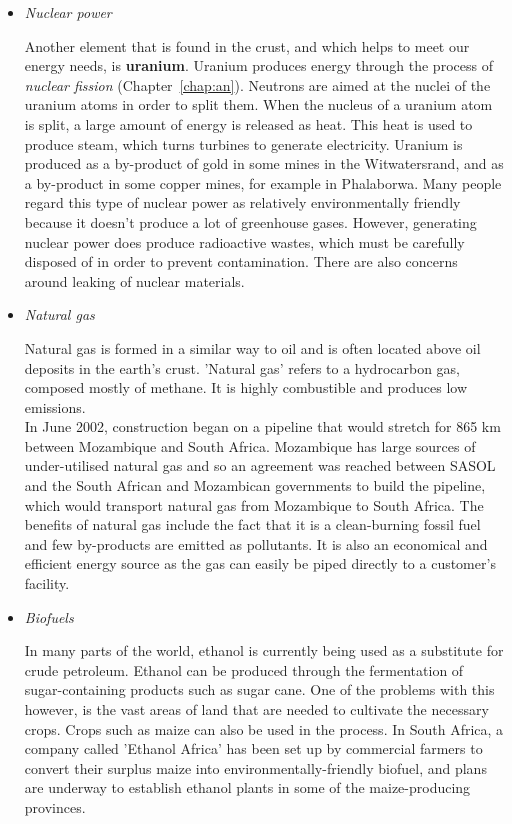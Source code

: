 \begin{itemize}

\item{\textit{Nuclear power}}

Another element that is found in the crust, and which helps to meet our energy needs, is \textbf{uranium}. Uranium produces energy through the process of \textit{nuclear fission} (Chapter~\ref{chap:an}). Neutrons are aimed at the nuclei of the uranium atoms in order to split them. When the nucleus of a uranium atom is split, a large amount of energy is released as heat. This heat is used to produce steam, which turns turbines to generate electricity. Uranium is produced as a by-product of gold in some mines in the Witwatersrand, and as a by-product in some copper mines, for example in Phalaborwa. Many people regard this type of nuclear power as relatively environmentally friendly because it doesn't produce a lot of greenhouse gases. However, generating nuclear power does produce radioactive wastes, which must be carefully disposed of in order to prevent contamination. There are also concerns around leaking of nuclear materials.

\item{\textit{Natural gas}

Natural gas is formed in a similar way to oil and is often located above oil deposits in the earth's crust. 'Natural gas' refers to a hydrocarbon gas, composed mostly of methane. It is highly combustible and produces low emissions.\\

In June 2002, construction began on a pipeline that would stretch for 865 km between Mozambique and South Africa. Mozambique has large sources of under-utilised natural gas and so an agreement was reached between SASOL and the South African and Mozambican governments to build the pipeline, which would transport natural gas from Mozambique to South Africa. The benefits of natural gas include the fact that it is a clean-burning fossil fuel and few by-products are emitted as pollutants. It is also an economical and efficient energy source as the gas can easily be piped directly to a customer's facility.}

\item{\textit{Biofuels}

In many parts of the world, ethanol is currently being used as a substitute for crude petroleum. Ethanol can be produced through the fermentation of sugar-containing products such as sugar cane. One of the problems with this however, is the vast areas of land that are needed to cultivate the necessary crops. Crops such as maize can also be used in the process.
In South Africa, a company called 'Ethanol Africa' has been set up by commercial farmers to convert their surplus maize into environmentally-friendly biofuel, and plans are underway to establish ethanol plants in some of the maize-producing provinces.}


\end{itemize}
